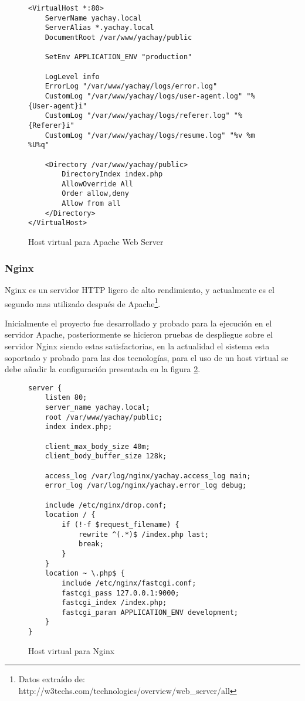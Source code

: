 \begin{figure}
\begin{verbatim}
<VirtualHost *:80>
    ServerName yachay.local
    ServerAlias *.yachay.local
    DocumentRoot /var/www/yachay/public

    SetEnv APPLICATION_ENV "production"

    LogLevel info
    ErrorLog "/var/www/yachay/logs/error.log"
    CustomLog "/var/www/yachay/logs/user-agent.log" "%{User-agent}i"
    CustomLog "/var/www/yachay/logs/referer.log" "%{Referer}i"
    CustomLog "/var/www/yachay/logs/resume.log" "%v %m %U%q"

    <Directory /var/www/yachay/public>
        DirectoryIndex index.php
        AllowOverride All
        Order allow,deny
        Allow from all
    </Directory>
</VirtualHost>
\end{verbatim}
\caption{Host virtual para Apache Web Server}
\label{config_apache}
\end{figure}

\subsubsection{Nginx}
Nginx es un servidor HTTP ligero de alto rendimiento, y actualmente es el
segundo mas utilizado después de Apache\footnote{Datos extraído de:
http://w3techs.com/technologies/overview/web\_server/all}.

Inicialmente el proyecto fue desarrollado y probado para la ejecución en el
servidor Apache, posteriormente se hicieron pruebas de despliegue sobre el
servidor Nginx siendo estas satisfactorias, en la actualidad el sistema esta
soportado y probado para las dos tecnologías, para el uso de un host virtual se
debe añadir la configuración presentada en la figura \ref{config_nginx}.

\begin{figure}
\begin{verbatim}
server {
    listen 80;
    server_name yachay.local;
    root /var/www/yachay/public;
    index index.php;

    client_max_body_size 40m;
    client_body_buffer_size 128k;

    access_log /var/log/nginx/yachay.access_log main;
    error_log /var/log/nginx/yachay.error_log debug;

    include /etc/nginx/drop.conf;
    location / {
        if (!-f $request_filename) {
            rewrite ^(.*)$ /index.php last;
            break;
        }
    }
    location ~ \.php$ {
        include /etc/nginx/fastcgi.conf;
        fastcgi_pass 127.0.0.1:9000;
        fastcgi_index /index.php;
        fastcgi_param APPLICATION_ENV development;
    }
}
\end{verbatim}
\caption{Host virtual para Nginx}
\label{config_nginx}
\end{figure}

